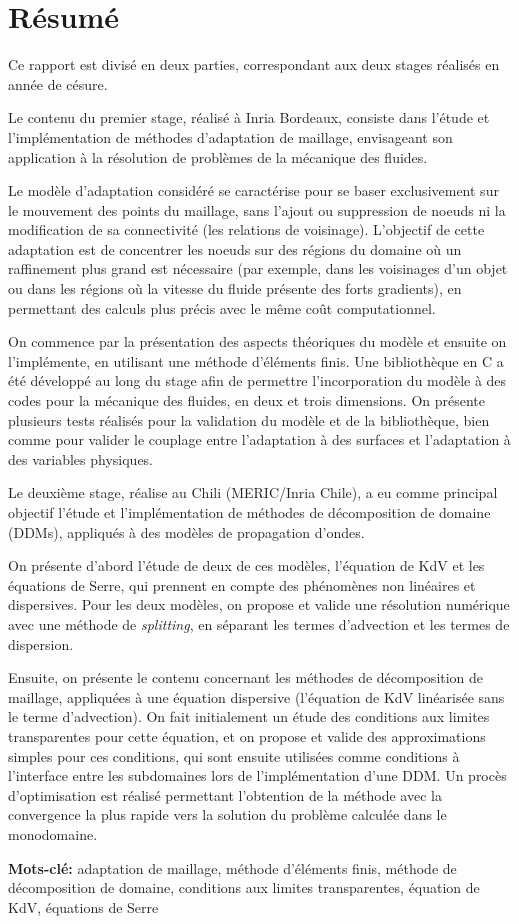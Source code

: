 \section*{Résumé}

\indent Ce rapport est divisé en deux parties, correspondant aux deux stages réalisés en année de césure.

\indent Le contenu du premier stage, réalisé à Inria Bordeaux, consiste dans l'étude et l'implémentation de méthodes d'adaptation de maillage, envisageant son application à la résolution de problèmes de la mécanique des fluides.

\indent Le modèle d'adaptation considéré se caractérise pour se baser exclusivement sur le mouvement des points du maillage, sans l'ajout ou suppression de noeuds ni la modification de sa connectivité (les relations de voisinage). L'objectif de cette adaptation est de concentrer les noeuds sur des régions du domaine où un raffinement plus grand est nécessaire (par exemple, dans les voisinages d'un objet ou dans les régions où la vitesse du fluide présente des forts gradients), en permettant des calculs plus précis avec le même coût computationnel.

\indent On commence par la présentation des aspects théoriques du modèle et ensuite on l'implémente, en utilisant une méthode d'éléments finis. Une bibliothèque en C a été développé au long du stage afin de permettre l'incorporation du modèle à des codes pour la mécanique des fluides, en deux et trois dimensions. On présente plusieurs tests réalisés pour la validation du modèle et de la bibliothèque, bien comme pour valider le couplage entre l'adaptation à des surfaces et l'adaptation à des variables physiques.

\indent Le deuxième stage, réalise au Chili (MERIC/Inria Chile), a eu comme principal objectif l'étude et l'implémentation de méthodes de décomposition de domaine (DDMs), appliqués à des modèles de propagation d'ondes.

\indent On présente d'abord l'étude de deux de ces modèles, l'équation de KdV et les équations de Serre, qui prennent en compte des phénomènes non linéaires et dispersives. Pour les deux modèles, on propose et valide une résolution numérique avec une méthode de \emph{splitting}, en séparant les termes d'advection et les termes de dispersion.

\indent Ensuite, on présente le contenu concernant les méthodes de décomposition de maillage, appliquées à une équation dispersive (l'équation de KdV linéarisée sans le terme d'advection). On fait initialement un étude des conditions aux limites transparentes pour cette équation, et on propose et valide des approximations simples pour ces conditions, qui sont ensuite utilisées comme conditions à l'interface entre les subdomaines lors de l'implémentation d'une DDM. Un procès d'optimisation est réalisé permettant l'obtention de la méthode avec la convergence la plus rapide vers la solution du problème calculée dans le monodomaine.

\indent \textbf{Mots-clé:} adaptation de maillage, méthode d'éléments finis, méthode de décomposition de domaine, conditions aux limites transparentes, équation de KdV, équations de Serre
